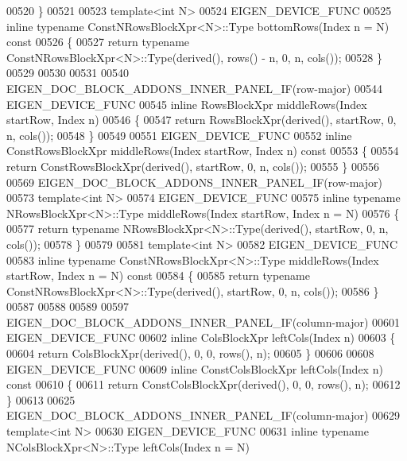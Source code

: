 \begin{DoxyCode}
00520 \}
00521 
00523 \textcolor{keyword}{template}<\textcolor{keywordtype}{int} N>
00524 EIGEN\_DEVICE\_FUNC
00525 \textcolor{keyword}{inline} \textcolor{keyword}{typename} ConstNRowsBlockXpr<N>::Type bottomRows(Index n = N)\textcolor{keyword}{ const}
00526 \textcolor{keyword}{}\{
00527   \textcolor{keywordflow}{return} \textcolor{keyword}{typename} ConstNRowsBlockXpr<N>::Type(derived(), rows() - n, 0, n, cols());
00528 \}
00529 
00530 
00531 
00540 EIGEN\_DOC\_BLOCK\_ADDONS\_INNER\_PANEL\_IF(row-major)
00544 EIGEN\_DEVICE\_FUNC
00545 \textcolor{keyword}{inline} RowsBlockXpr middleRows(Index startRow, Index n)
00546 \{
00547   \textcolor{keywordflow}{return} RowsBlockXpr(derived(), startRow, 0, n, cols());
00548 \}
00549 
00551 EIGEN\_DEVICE\_FUNC
00552 \textcolor{keyword}{inline} ConstRowsBlockXpr middleRows(Index startRow, Index n)\textcolor{keyword}{ const}
00553 \textcolor{keyword}{}\{
00554   \textcolor{keywordflow}{return} ConstRowsBlockXpr(derived(), startRow, 0, n, cols());
00555 \}
00556 
00569 EIGEN\_DOC\_BLOCK\_ADDONS\_INNER\_PANEL\_IF(row-major)
00573 \textcolor{keyword}{template}<\textcolor{keywordtype}{int} N>
00574 EIGEN\_DEVICE\_FUNC
00575 \textcolor{keyword}{inline} \textcolor{keyword}{typename} NRowsBlockXpr<N>::Type middleRows(Index startRow, Index n = N)
00576 \{
00577   \textcolor{keywordflow}{return} \textcolor{keyword}{typename} NRowsBlockXpr<N>::Type(derived(), startRow, 0, n, cols());
00578 \}
00579 
00581 \textcolor{keyword}{template}<\textcolor{keywordtype}{int} N>
00582 EIGEN\_DEVICE\_FUNC
00583 \textcolor{keyword}{inline} \textcolor{keyword}{typename} ConstNRowsBlockXpr<N>::Type middleRows(Index startRow, Index n = N)\textcolor{keyword}{ const}
00584 \textcolor{keyword}{}\{
00585   \textcolor{keywordflow}{return} \textcolor{keyword}{typename} ConstNRowsBlockXpr<N>::Type(derived(), startRow, 0, n, cols());
00586 \}
00587 
00588 
00589 
00597 EIGEN\_DOC\_BLOCK\_ADDONS\_INNER\_PANEL\_IF(column-major)
00601 EIGEN\_DEVICE\_FUNC
00602 \textcolor{keyword}{inline} ColsBlockXpr leftCols(Index n)
00603 \{
00604   \textcolor{keywordflow}{return} ColsBlockXpr(derived(), 0, 0, rows(), n);
00605 \}
00606 
00608 EIGEN\_DEVICE\_FUNC
00609 \textcolor{keyword}{inline} ConstColsBlockXpr leftCols(Index n)\textcolor{keyword}{ const}
00610 \textcolor{keyword}{}\{
00611   \textcolor{keywordflow}{return} ConstColsBlockXpr(derived(), 0, 0, rows(), n);
00612 \}
00613 
00625 EIGEN\_DOC\_BLOCK\_ADDONS\_INNER\_PANEL\_IF(column-major)
00629 \textcolor{keyword}{template}<\textcolor{keywordtype}{int} N>
00630 EIGEN\_DEVICE\_FUNC
00631 \textcolor{keyword}{inline} \textcolor{keyword}{typename} NColsBlockXpr<N>::Type leftCols(Index n = N)

\end{DoxyCode}
